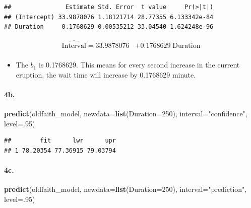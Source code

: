 \documentclass[]{article}
\newenvironment{Shaded}{\begin{snugshade}}{\end{snugshade}}
\newcommand{\KeywordTok}[1]{\textcolor[rgb]{0.13,0.29,0.53}{\textbf{#1}}}
\newcommand{\DataTypeTok}[1]{\textcolor[rgb]{0.13,0.29,0.53}{#1}}
\newcommand{\DecValTok}[1]{\textcolor[rgb]{0.00,0.00,0.81}{#1}}
\newcommand{\StringTok}[1]{\textcolor[rgb]{0.31,0.60,0.02}{#1}}
\newcommand{\NormalTok}[1]{#1}
\providecommand{\tightlist}{%
  \setlength{\itemsep}{0pt}\setlength{\parskip}{0pt}}
\let\oldparagraph\paragraph
\renewcommand{\paragraph}[1]{\oldparagraph{#1}\mbox{}}
\begin{document}
\begin{verbatim}
##               Estimate Std. Error  t value     Pr(>|t|)
## (Intercept) 33.9878076 1.18121714 28.77355 6.133342e-84
## Duration     0.1768629 0.00535212 33.04540 1.624248e-96
\end{verbatim}

\[
\begin{align*}
\mathrm{\hat{Interval}} = 33.9878076 
    &+ 0.1768629\;  \mathrm{Duration}    \\
\end{align*}
\]

\begin{itemize}
\tightlist
\item
  The \(b_{1}\) is 0.1768629. This means for every second increase in
  the current eruption, the wait time will increase by 0.1768629 minute.
\end{itemize}

\paragraph{\texorpdfstring{4b. }{4b.  }}\label{b.-1}

\begin{Shaded}
\begin{Highlighting}[]
\KeywordTok{predict}\NormalTok{(oldfaith_model, }\DataTypeTok{newdata=}\KeywordTok{list}\NormalTok{(}\DataTypeTok{Duration=}\DecValTok{250}\NormalTok{), }\DataTypeTok{interval=}\StringTok{"confidence"}\NormalTok{, }\DataTypeTok{level=}\NormalTok{.}\DecValTok{95}\NormalTok{)}
\end{Highlighting}
\end{Shaded}

\begin{verbatim}
##        fit      lwr      upr
## 1 78.20354 77.36915 79.03794
\end{verbatim}

\paragraph{\texorpdfstring{4c. }{4c.  }}\label{c.-1}

\begin{Shaded}
\begin{Highlighting}[]
\KeywordTok{predict}\NormalTok{(oldfaith_model, }\DataTypeTok{newdata=}\KeywordTok{list}\NormalTok{(}\DataTypeTok{Duration=}\DecValTok{250}\NormalTok{), }\DataTypeTok{interval=}\StringTok{"prediction"}\NormalTok{, }\DataTypeTok{level=}\NormalTok{.}\DecValTok{95}\NormalTok{)}
\end{Highlighting}
\end{Shaded}
\end{document}
